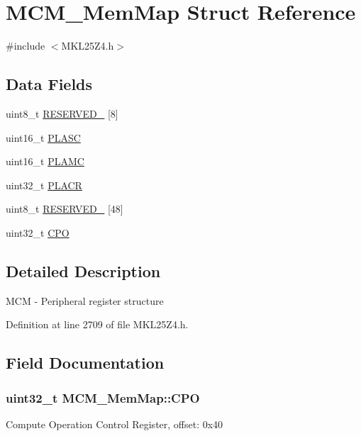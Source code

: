 \hypertarget{struct_m_c_m___mem_map}{}\section{M\+C\+M\+\_\+\+Mem\+Map Struct Reference}
\label{struct_m_c_m___mem_map}


{\ttfamily \#include $<$M\+K\+L25\+Z4.\+h$>$}

\subsection*{Data Fields}
\begin{DoxyCompactItemize}
\item 
uint8\+\_\+t \hyperlink{struct_m_c_m___mem_map_aa03546833695c701bce946849c4acf8b}{R\+E\+S\+E\+R\+V\+E\+D\+\_} \mbox{[}8\mbox{]}
\item 
uint16\+\_\+t \hyperlink{struct_m_c_m___mem_map_ad68f64d82524bb0b181a837967b8e248}{P\+L\+A\+SC}
\item 
uint16\+\_\+t \hyperlink{struct_m_c_m___mem_map_a7d749b910777a6b67ea94f2379c628ee}{P\+L\+A\+MC}
\item 
uint32\+\_\+t \hyperlink{struct_m_c_m___mem_map_a520575ffc4561724479404679213900b}{P\+L\+A\+CR}
\item 
uint8\+\_\+t \hyperlink{struct_m_c_m___mem_map_a11d8df331970d7ffaf79e23b95c82b89}{R\+E\+S\+E\+R\+V\+E\+D\+\_} \mbox{[}48\mbox{]}
\item 
uint32\+\_\+t \hyperlink{struct_m_c_m___mem_map_a887b6813ace7322a6dd2af1f71d7e6c6}{C\+PO}
\end{DoxyCompactItemize}


\subsection{Detailed Description}
M\+CM -\/ Peripheral register structure 

Definition at line 2709 of file M\+K\+L25\+Z4.\+h.



\subsection{Field Documentation}
\subsubsection[{\texorpdfstring{C\+PO}{CPO}}]{\setlength{\rightskip}{0pt plus 5cm}uint32\+\_\+t M\+C\+M\+\_\+\+Mem\+Map\+::\+C\+PO}\hypertarget{struct_m_c_m___mem_map_a887b6813ace7322a6dd2af1f71d7e6c6}{}\label{struct_m_c_m___mem_map_a887b6813ace7322a6dd2af1f71d7e6c6}
Compute Operation Control Register, offset\+: 0x40 

